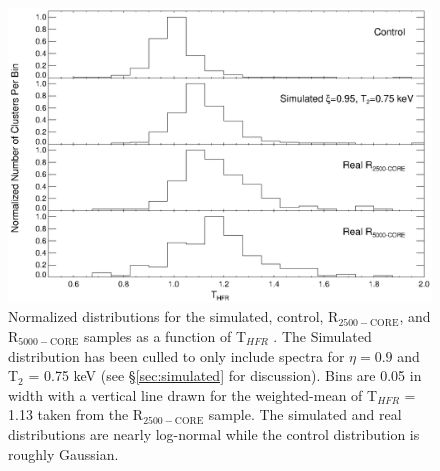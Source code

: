 \documentclass{emulateapj}
\newcommand{\tf}{T$_{HFR}$ }
\begin{document}
\clearpage
\begin{figure}[htp]
\begin{center}
\includegraphics[scale=1.0]{ft_histo}
\caption{\small Normalized distributions for the simulated, control, 
R$_{2500-\text{CORE}}$, and R$_{5000-\text{CORE}}$ samples as a function of
\tf. The Simulated distribution  has been culled to only include
spectra for $\eta = 0.9$ and T$_{2}$ = 0.75 keV (see
\S\ref{sec:simulated} for discussion). Bins are 0.05 in width with a vertical line
drawn for the weighted-mean of \tf = 1.13 taken from the R$_{2500-\text{CORE}}$
sample. The simulated and real distributions are nearly log-normal
while the control distribution is roughly Gaussian.}
\label{fig:ft_histo}
\end{center}
\end{figure}
\end{document}
